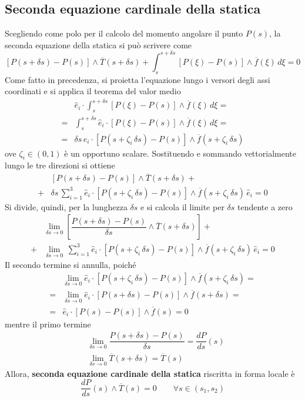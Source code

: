 \subsection{Seconda equazione cardinale della statica}
Scegliendo come polo per il calcolo del momento angolare il punto $P(s)$, la seconda equazione della statica si può scrivere come
\[
[P(s+\delta s) - P(s)] \wedge \overline{T}(s+\delta s) + \int_s^{s+\delta s} [P(\xi) - P(s)]\wedge \overline{f}(\xi)\,d\xi = 0
\]
Come fatto in precedenza, si proietta l'equazione lungo i versori degli assi coordinati e si applica il teorema del valor medio
\begin{align*}
&\hat{e}_i \cdot \int_s^{s+\delta s} [P(\xi) - P(s)]\wedge \overline{f}(\xi)\,d\xi =\\ =&\int_s^{s+\delta s} \hat{e}_i \cdot [P(\xi) - P(s)]\wedge \overline{f}(\xi)\,d\xi =\\=& \delta s\,\hat{e}_i \cdot [P(s+\zeta_i\,\delta s) - P(s)] \wedge \overline{f}(s+\zeta_i\,\delta s)
\end{align*}
ove $\zeta_i \in (0,1)$ è un opportuno scalare. Sostituendo e sommando vettorialmente lungo le tre direzioni si ottiene
\begin{align*}
&[P(s+\delta s) - P(s)] \wedge \overline{T}(s+\delta s) +\\+& \delta s\,\sum_{i=1}^3 \hat{e}_i \cdot [P(s + \zeta_i\,\delta s) - P(s)]\wedge \overline{f}(s + \zeta_i\,\delta s)\,\hat{e}_i = 0
\end{align*}
Si divide, quindi, per la lunghezza $\delta s$ e si calcola il limite per $\delta s$ tendente a zero
\begin{align*}
&\lim_{\delta s\to 0} \left[ \dfrac{P(s+\delta s) - P(s)}{\delta s} \wedge \overline{T}(s + \delta s)\right] +\\
+&\lim_{\delta s\to 0} \,\sum_{i=1}^3 \hat{e}_i \cdot [P(s+\zeta_i\,\delta s) - P(s)]\wedge \overline{f}(s+\zeta_i\,\delta s)\,\hat{e}_i = 0
\end{align*}
Il secondo termine si annulla, poiché
\begin{align*}
&\lim_{\delta s\to 0} \hat{e}_i \cdot [P(s + \zeta_i\,\delta s) - P(s)] \wedge \overline{f}(s+\zeta_i\,\delta s) =\\
=& \lim_{\delta s \to 0} \hat{e}_i \cdot [P(s + \delta s) - P(s)] \wedge \overline{f}(s+\delta s) =\\
=& \hat{e}_i \cdot [P(s) - P(s)]\wedge \overline{f}(s) = 0
\end{align*}
mentre il primo termine
\begin{align*}
&\lim_{\delta s \to 0} \dfrac{P(s+\delta s) - P(s)}{\delta s} = \dfrac{dP}{ds}(s)\\[1.5ex]
&\lim_{\delta s \to 0} \overline{T}(s+\delta s) = \overline{T}(s)
\end{align*}
Allora, \textbf{seconda equazione cardinale della statica} riscritta in forma locale è
\begin{equation}
\label{eq:seconda_eq_cardinale_statica}
\dfrac{dP}{ds}(s) \wedge \overline{T}(s) = 0\qquad \forall s\in (s_1, s_2)
\end{equation}

